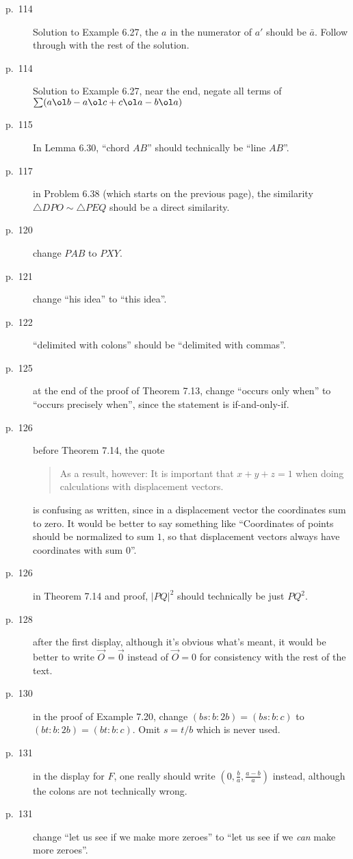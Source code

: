 \documentclass[11pt]{scrartcl}
\begin{document}
\begin{description}
\item[p.\  114] Solution to Example 6.27, the $a$ in the numerator of $a'$ should be $\bar a$.
  Follow through with the rest of the solution.
\item[p.\  114] Solution to Example 6.27, near the end, negate all terms of
  $\sum (a \ol b - a \ol c + c \ol a - b \ol a)$
\item[p.\  115] In Lemma 6.30, ``chord $AB$'' should technically be ``line $AB$''.
\item[p.\  117] in Problem 6.38 (which starts on the previous page), the similarity
  $\triangle DPO \sim \triangle PEQ$ should be a direct similarity.
\item[p.\  120] change $PAB$ to $PXY$.
\item[p.\  121] change ``his idea'' to ``this idea''.
\item[p.\  122] ``delimited with colons'' should be ``delimited with commas''.
\item[p.\  125] at the end of the proof of Theorem 7.13,
  change ``occurs only when'' to ``occurs precisely when'',
  since the statement is if-and-only-if.
\item[p.\  126] before Theorem 7.14, the quote
  \begin{quote}
    As a result, however:
    It is important that $x+y+z=1$ when doing calculations with displacement vectors.
  \end{quote}
  is confusing as written, since in a displacement vector the coordinates sum to zero.
  It would be better to say something like
  ``Coordinates of points should be normalized to sum $1$,
  so that displacement vectors always have coordinates with sum $0$''.
\item[p.\  126] in Theorem 7.14 and proof, $|PQ|^2$ should technically be just $PQ^2$.
\item[p.\  128] after the first display,
  although it's obvious what's meant, it would be better to write $\vec O = \vec 0$
  instead of $\vec O = 0$ for consistency with the rest of the text.
\item[p.\  130] in the proof of Example 7.20, change $(bs:b:2b)=(bs:b:c)$ to $(bt:b:2b)=(bt:b:c)$.
  Omit $s=t/b$ which is never used.
\item[p.\  131] in the display for $F$, one really should write $(0, \frac ba, \frac{a-b}{a})$ instead,
  although the colons are not technically wrong.
\item[p.\  131] change ``let us see if we make more zeroes''
  to ``let us see if we \emph{can} make more zeroes''.

\end{description}
\end{document}
